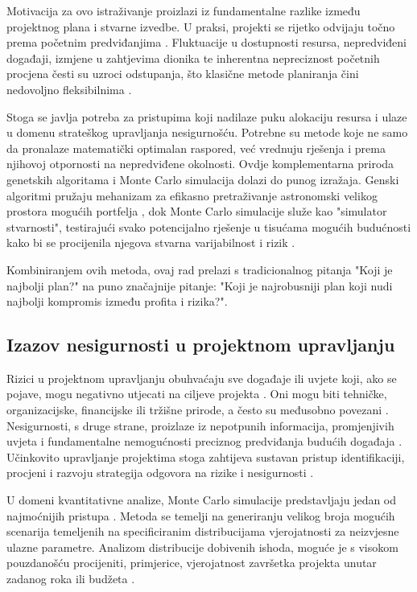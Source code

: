 Motivacija za ovo istraživanje proizlazi iz fundamentalne razlike između projektnog plana i stvarne izvedbe. U praksi, projekti se rijetko odvijaju točno prema početnim predviđanjima \cite{Kerzner2017}. Fluktuacije u dostupnosti resursa, nepredviđeni događaji, izmjene u zahtjevima dionika te inherentna nepreciznost početnih procjena česti su uzroci odstupanja, što klasične metode planiranja čini nedovoljno fleksibilnima \cite{PMI2021}.

Stoga se javlja potreba za pristupima koji nadilaze puku alokaciju resursa i ulaze u domenu strateškog upravljanja nesigurnošću. Potrebne su metode koje ne samo da pronalaze matematički optimalan raspored, već vrednuju rješenja i prema njihovoj otpornosti na nepredviđene okolnosti. Ovdje komplementarna priroda genetskih algoritama i Monte Carlo simulacija dolazi do punog izražaja. Genski algoritmi pružaju mehanizam za efikasno pretraživanje astronomski velikog prostora mogućih portfelja \cite{Goldberg1989}, dok Monte Carlo simulacije služe kao "simulator stvarnosti", testirajući svako potencijalno rješenje u tisućama mogućih budućnosti kako bi se procijenila njegova stvarna varijabilnost i rizik \cite{Rubinstein2016}.

Kombiniranjem ovih metoda, ovaj rad prelazi s tradicionalnog pitanja "Koji je najbolji plan?" na puno značajnije pitanje: "Koji je najrobusniji plan koji nudi najbolji kompromis između profita i rizika?".

\subsection{Izazov nesigurnosti u projektnom upravljanju}

Rizici u projektnom upravljanju obuhvaćaju sve događaje ili uvjete koji, ako se pojave, mogu negativno utjecati na ciljeve projekta \cite{Hillson2009}. Oni mogu biti tehničke, organizacijske, financijske ili tržišne prirode, a često su međusobno povezani \cite{PMI2021}. Nesigurnosti, s druge strane, proizlaze iz nepotpunih informacija, promjenjivih uvjeta i fundamentalne nemogućnosti preciznog predviđanja budućih događaja \cite{Smith2014}. Učinkovito upravljanje projektima stoga zahtijeva sustavan pristup identifikaciji, procjeni i razvoju strategija odgovora na rizike i nesigurnosti \cite{Hillson2009}.

U domeni kvantitativne analize, Monte Carlo simulacije predstavljaju jedan od najmoćnijih pristupa \cite{Vose2008}. Metoda se temelji na generiranju velikog broja mogućih scenarija temeljenih na specificiranim distribucijama vjerojatnosti za neizvjesne ulazne parametre. Analizom distribucije dobivenih ishoda, moguće je s visokom pouzdanošću procijeniti, primjerice, vjerojatnost završetka projekta unutar zadanog roka ili budžeta \cite{Rubinstein2016}.

